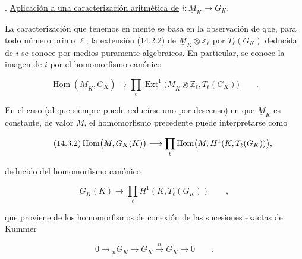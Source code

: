 
\par\medskip
{}. \underline{Aplicación a una caracterización aritmética de}
$i:\underline M_K\longrightarrow G_K$.

La caracterización que tenemos en mente se basa en la observación de
que, para todo número primo $\ell$, la extensión (14.2.2) de
$\underline M_K\otimes\mathbb Z_\ell$ por $T_\ell(G_K)$ deducida de
$i$ se conoce por medios puramente algebraicos. En particular, se
conoce la imagen de $i$ por el homomorfismo canónico

\begin{equation}\tag{14.3.1}
 \operatorname{Hom}(\underline M_K,G_K)\longrightarrow
 \prod_\ell\operatorname{Ext}^1
 \bigl(\underline M_K\otimes\mathbb Z_\ell,T_\ell(G_K)\bigr)
 \qquad .
\end{equation}

\noindent
En el caso (al que siempre puede reducirse uno por descenso) en que
$\underline M_K$ es constante, de valor $M$, el homomorfismo precedente
puede interpretarse como

\begin{equation}\tag{14.3.2}
 \operatorname{Hom}\bigl(M,G_K(K)\bigr)\longrightarrow
 \prod_\ell
 \sisi{\operatorname{Hom}\bigl(M,H^1(K,T_\ell(G_K))}%
 {\operatorname{Hom}\bigl(M,H^1(K,T_\ell(G_K))\bigr)},
\end{equation}

\noindent
deducido del homomorfismo canónico

\begin{equation}\tag{14.3.3}
 G_K(K)\longrightarrow\prod_\ell H^1(K,T_\ell(G_K))
 \qquad ,
\end{equation}

\noindent
que proviene de los homomorfismos de conexión de las sucesiones exactas
de Kummer

\begin{equation*}
 0\longrightarrow{}_nG_K\longrightarrow G_K
 \xrightarrow{\ n\ }G_K\longrightarrow0\qquad .
\end{equation*}

